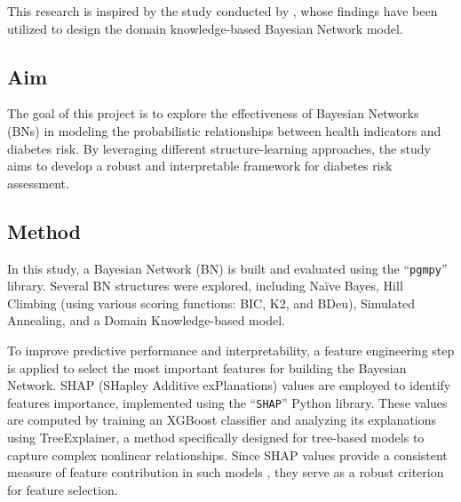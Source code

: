 \documentclass[letterpaper]{article}
\begin{document}
This research is inspired by the study conducted by \citet{kong2024}, whose findings have been utilized to design the domain knowledge-based Bayesian Network model.

\subsection{Aim}

The goal of this project is to explore the effectiveness of Bayesian Networks (BNs) in modeling the probabilistic relationships between health indicators and diabetes risk. By leveraging different structure-learning approaches, the study aims to develop a robust and interpretable framework for diabetes risk assessment.

\subsection{Method} 

In this study, a Bayesian Network (BN) is built and evaluated using the ``\texttt{pgmpy}'' library. Several BN structures were explored, including Naïve Bayes, Hill Climbing (using various scoring functions: BIC, K2, and BDeu), Simulated Annealing, and a Domain Knowledge-based model.  


To improve predictive performance and interpretability, a feature engineering step is applied to select the most important features for building the Bayesian Network. SHAP (SHapley Additive exPlanations) values are employed to identify features importance, implemented using the ``\texttt{SHAP}'' Python library. These values are computed by training an XGBoost classifier \citep{XGBoost} and analyzing its explanations using TreeExplainer, a method specifically designed for tree-based models to capture complex nonlinear relationships. Since SHAP values provide a consistent measure of feature contribution in such models \citep{SHAP}, they serve as a robust criterion for feature selection.

\end{document}

